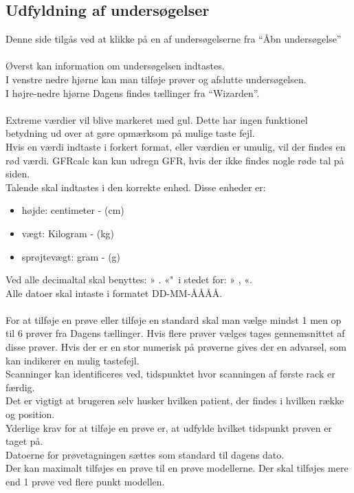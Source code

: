 \documentclass{article}
\begin{document}
\subsection{Udfyldning af undersøgelser}\label{fill_study}
Denne side tilgås ved at klikke på en af undersøgelserne fra “Åbn undersøgelse”\\\\
Øverst kan information om undersøgelsen indtastes.\\
I venstre nedre hjørne kan man tilføje prøver og afslutte undersøgelsen.\\ 
I højre-nedre hjørne Dagens findes tællinger fra “Wizarden”.\\\\
Extreme værdier vil blive markeret med gul. Dette har ingen funktionel betydning ud over at gøre opmærksom på mulige taste fejl.\\ Hvis en værdi indtaste i forkert format, eller værdien er umulig, vil der findes en rød værdi. GFRcalc kan kun udregn GFR, hvis der ikke findes nogle røde tal på siden.\\
Talende skal indtastes i den korrekte enhed. Disse enheder er:
\begin{itemize}
	\item højde: centimeter - (cm)
	\item vægt: Kilogram - (kg)
	\item sprøjtevægt: gram - (g)
\end{itemize}
Ved alle decimaltal skal benyttes: » . «"$\,$ i stedet for: » , «.\\
Alle datoer skal intaste i formatet DD-MM-ÅÅÅÅ.\\\\
For at tilføje en prøve eller tilføje en standard skal man vælge mindst 1 men op til 6 prøver fra Dagens tællinger. Hvis flere prøver vælges tages gennemsnittet af disse prøver. Hvis der er en stor numerisk på prøverne gives der en advarsel, som kan indikerer en mulig tastefejl.\\
Scanninger kan identificeres ved, tidspunktet hvor scanningen af første rack er færdig.\\
Det er vigtigt at brugeren selv husker hvilken patient, der findes i hvilken række og position.\\
Yderlige krav for at tilføje en prøve er, at udfylde hvilket tidspunkt prøven er taget på.\\ Datoerne for prøvetagningen sættes som standard til dagens dato.\\
Der kan maximalt tilføjes en prøve til en prøve modellerne. Der skal tilføjes mere end 1 prøve ved flere punkt modellen.\\
\end{document}
